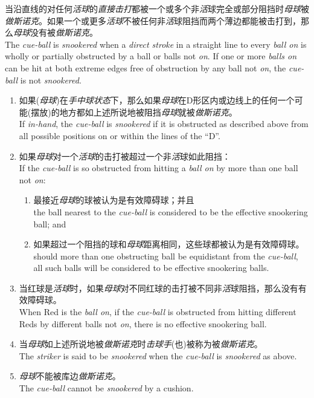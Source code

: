 \noindent 当沿直线的对任何\emph{活球}的\emph{直接击打}都被一个或多个非\emph{活}球完全或部分阻挡时\emph{母球}被\emph{做斯诺克}。如果一个或更多\emph{活球}不被任何非\emph{活}球阻挡而两个薄边都能被击打到，那么\emph{母球}没有被\emph{做斯诺克}。\\
The \emph{cue-ball} is \emph{snookered} when a \emph{direct stroke} in a straight line to every \emph{ball on} is wholly or partially obstructed by a ball or balls not \emph{on}. If one or more \emph{balls on} can be hit at both extreme edges free of obstruction by any ball not \emph{on}, the \emph{cue-ball} is not \emph{snookered}.
\begin{enumerate}[label=(\alph*)]
    \item 如果(\emph{母球})在\emph{手中球状态}下，那么如果\emph{母球}在D形区内或边线上的任何一个可能(摆放)的地方都如上述所说地被阻挡\emph{母球}就被\emph{做斯诺克}。\\
    If \emph{in-hand}, the \emph{cue-ball} is \emph{snookered} if it is obstructed as described above from all possible positions on or within the lines of the ``D''.
    \item 如果\emph{母球}对一个\emph{活球}的击打被超过一个非\emph{活}球如此阻挡：\\
    If the \emph{cue-ball} is so obstructed from hitting a \emph{ball on} by more than one ball not \emph{on}:
    \begin{enumerate}[label=(\roman*)]
        \item 最接近\emph{母球}的球被认为是有效障碍球；并且\\
        the ball nearest to the \emph{cue-ball} is considered to be the effective snookering ball; and
        \item 如果超过一个阻挡的球和\emph{母球}距离相同，这些球都被认为是有效障碍球。\\
        should more than one obstructing ball be equidistant from the \emph{cue-ball}, all such balls will be considered to be effective snookering balls.
    \end{enumerate}
    \item 当红球是\emph{活球}时，如果\emph{母球}对不同红球的击打被不同非\emph{活}球阻挡，那么没有有效障碍球。\\
    When Red is the \emph{ball on}, if the \emph{cue-ball} is obstructed from hitting different Reds by different balls not \emph{on}, there is no effective snookering ball.
    \item 当\emph{母球}如上述所说地被\emph{做斯诺克}时\emph{击球手}(也)被称为被\emph{做斯诺克}。\\
    The \emph{striker} is said to be \emph{snookered} when the \emph{cue-ball} is \emph{snookered} as above.
    \item \emph{母球}不能被库边\emph{做斯诺克}。\\
    The \emph{cue-ball} cannot be \emph{snookered} by a cushion.
\end{enumerate}

